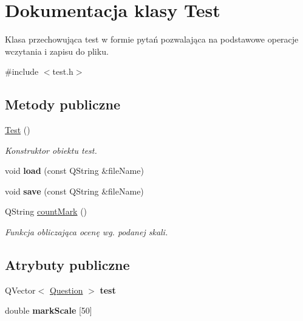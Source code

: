 \hypertarget{classTest}{\section{\-Dokumentacja klasy \-Test}
\label{classTest}
}


\-Klasa przechowująca test w formie pytań pozwalająca na podstawowe operacje wczytania i zapisu do pliku.  




{\ttfamily \#include $<$test.\-h$>$}

\subsection*{\-Metody publiczne}
\begin{DoxyCompactItemize}
\item 
\hyperlink{classTest_a99f2bbfac6c95612322b0f10e607ebe5}{\-Test} ()
\begin{DoxyCompactList}\small\item\em \-Konstruktor obiektu test. \end{DoxyCompactList}\item 
\hypertarget{classTest_a607ff8fba625b9a065d6f244848c0fb9}{void {\bfseries load} (const \-Q\-String \&file\-Name)}\label{classTest_a607ff8fba625b9a065d6f244848c0fb9}

\item 
\hypertarget{classTest_a6cbb43142b5a32d0cdfa69a40944dfec}{void {\bfseries save} (const \-Q\-String \&file\-Name)}\label{classTest_a6cbb43142b5a32d0cdfa69a40944dfec}

\item 
\-Q\-String \hyperlink{classTest_a7c3c36b740d45f155af53efe7ab58bac}{count\-Mark} ()
\begin{DoxyCompactList}\small\item\em \-Funkcja obliczająca ocenę wg. podanej skali. \end{DoxyCompactList}\end{DoxyCompactItemize}
\subsection*{\-Atrybuty publiczne}
\begin{DoxyCompactItemize}
\item 
\hypertarget{classTest_ad0bd7c55b517abd81be08605e4bfccf4}{\-Q\-Vector$<$ \hyperlink{classQuestion}{\-Question} $>$ {\bfseries test}}\label{classTest_ad0bd7c55b517abd81be08605e4bfccf4}

\item 
\hypertarget{classTest_a15bd0f8f245da177638d6a27d15c1aff}{double {\bfseries mark\-Scale} \mbox{[}50\mbox{]}}\label{classTest_a15bd0f8f245da177638d6a27d15c1aff}

\end{DoxyCompactItemize}


